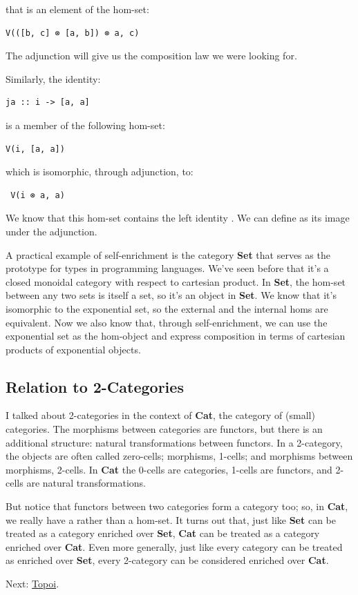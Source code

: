 that is an element of the hom-set:

\begin{verbatim}
V(([b, c] ⊗ [a, b]) ⊗ a, c)
\end{verbatim}

The adjunction will give us the composition law we were looking for.

Similarly, the identity:

\begin{verbatim}
ja :: i -> [a, a]
\end{verbatim}

is a member of the following hom-set:

\begin{verbatim}
V(i, [a, a])
\end{verbatim}

which is isomorphic, through adjunction, to:

\begin{verbatim}
 V(i ⊗ a, a)
\end{verbatim}

We know that this hom-set contains the left identity . We can
define  as its image under the adjunction.

A practical example of self-enrichment is the category \textbf{Set} that
serves as the prototype for types in programming languages. We've seen
before that it's a closed monoidal category with respect to cartesian
product. In \textbf{Set}, the hom-set between any two sets is itself a
set, so it's an object in \textbf{Set}. We know that it's isomorphic to
the exponential set, so the external and the internal homs are
equivalent. Now we also know that, through self-enrichment, we can use
the exponential set as the hom-object and express composition in terms
of cartesian products of exponential objects.

\subsection{Relation to 2-Categories}\label{relation-to-2-categories}

I talked about 2-categories in the context of \textbf{Cat}, the category
of (small) categories. The morphisms between categories are functors,
but there is an additional structure: natural transformations between
functors. In a 2-category, the objects are often called zero-cells;
morphisms, 1-cells; and morphisms between morphisms, 2-cells. In
\textbf{Cat} the 0-cells are categories, 1-cells are functors, and
2-cells are natural transformations.

But notice that functors between two categories form a category too; so,
in \textbf{Cat}, we really have a  rather than a
hom-set. It turns out that, just like \textbf{Set} can be treated as a
category enriched over \textbf{Set}, \textbf{Cat} can be treated as a
category enriched over \textbf{Cat}. Even more generally, just like
every category can be treated as enriched over \textbf{Set}, every
2-category can be considered enriched over \textbf{Cat}.

Next: \href{https://bartoszmilewski.com/2017/07/22/topoi/}{Topoi}.
